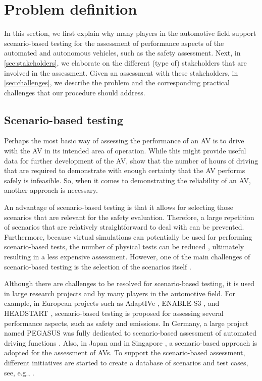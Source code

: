\section{Problem definition}
\label{sec:problem}

In this section, we first explain why many players in the automotive field support scenario-based testing for the assessment of performance aspects of the automated and autonomous vehicles, such as the safety assessment. Next, in \cref{sec:stakeholders}, we elaborate on the different (type of) stakeholders that are involved in the assessment. Given an assessment with these stakeholders, in \cref{sec:challenges}, we describe the problem and the corresponding practical challenges that our procedure should address.



\subsection{Scenario-based testing}
\label{sec:scenario-based testing}

Perhaps the most basic way of assessing the performance of an AV is to drive with the AV in its intended area of operation. While this might provide useful data for further development of the AV, \textcite{kalra2016driving,wachenfeld2016release} show that the number of hours of driving that are required to demonstrate with enough certainty that the AV performs safely is infeasible. So, when it comes to demonstrating the reliability of an AV, another approach is necessary.

An advantage of scenario-based testing is that it allows for selecting those scenarios that are relevant for the safety evaluation. Therefore, a large repetition of scenarios that are relatively straightforward to deal with can be prevented. Furthermore, because virtual simulations can potentially be used for performing scenario-based tests, the number of physical tests can be reduced \autocite{ploeg2018cetran}, ultimately resulting in a less expensive assessment. However, one of the main challenges of scenario-based testing is the selection of the scenarios itself \autocite{riedmaier2020survey}. 

Although there are challenges to be resolved for scenario-based testing, it is used in large research projects and by many players in the automotive field. For example, in European projects such as AdaptIVe \autocite{roesener2017comprehensive}, ENABLE-S3 \autocite{leitner2019validation}, and HEADSTART \autocite{wagener2020headstart}, scenario-based testing is proposed for assessing several performance aspects, such as safety and emissions. In Germany, a large project named PEGASUS was fully dedicated to scenario-based assessment of automated driving functions \autocite{pegasus2019}. Also, in Japan \autocite{jacobo2019development} and in Singapore \autocite{cetran2020}, a scenario-based approach is adopted for the assessment of AVs. To support the scenario-based assessment, different initiatives are started to create a database of scenarios and test cases, see, e.g., \autocite{elrofai2018scenario,myers2020pass}.

